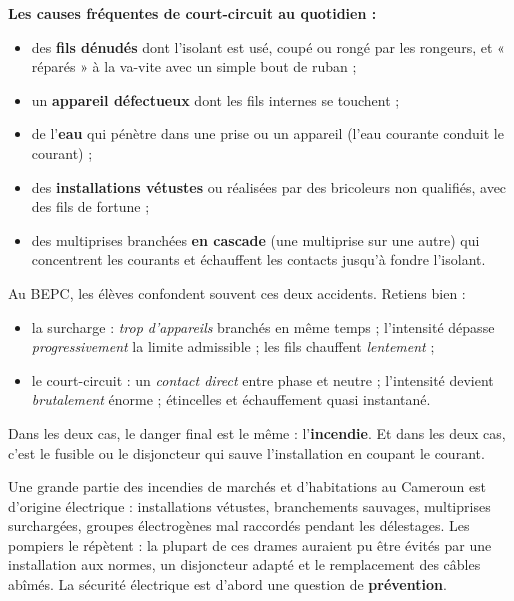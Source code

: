 \documentclass[11pt]{article}
\newcommand{\cle}[1]{{\popxbold\color{popdark}#1}}
\begin{document}
\textbf{Les causes fréquentes de court-circuit au quotidien :}
\begin{itemize}
\item des \textbf{fils dénudés} dont l'isolant est usé, coupé ou rongé par les rongeurs, et « réparés » à la va-vite avec un simple bout de ruban ;
\item un \textbf{appareil défectueux} dont les fils internes se touchent ;
\item de l'\textbf{eau} qui pénètre dans une prise ou un appareil (l'eau courante conduit le courant) ;
\item des \textbf{installations vétustes} ou réalisées par des bricoleurs non qualifiés, avec des fils de fortune ;
\item des multiprises branchées \textbf{en cascade} (une multiprise sur une autre) qui concentrent les courants et échauffent les contacts jusqu'à fondre l'isolant.
\end{itemize}

\begin{attention}
Au BEPC, les élèves confondent souvent ces deux accidents. Retiens bien :
\begin{itemize}
\item la \cle{surcharge} : \emph{trop d'appareils} branchés en même temps ; l'intensité dépasse \emph{progressivement} la limite admissible ; les fils chauffent \emph{lentement} ;
\item le \cle{court-circuit} : un \emph{contact direct} entre phase et neutre ; l'intensité devient \emph{brutalement} énorme ; étincelles et échauffement quasi instantané.
\end{itemize}
Dans les deux cas, le danger final est le même : l'\textbf{incendie}. Et dans les deux cas, c'est le fusible ou le disjoncteur qui sauve l'installation en coupant le courant.
\end{attention}

\begin{savaistu}
Une grande partie des incendies de marchés et d'habitations au Cameroun est d'origine électrique : installations vétustes, branchements sauvages, multiprises surchargées, groupes électrogènes mal raccordés pendant les délestages. Les pompiers le répètent : la plupart de ces drames auraient pu être évités par une installation aux normes, un disjoncteur adapté et le remplacement des câbles abîmés. La sécurité électrique est d'abord une question de \textbf{prévention}.
\end{savaistu}
\end{document}
